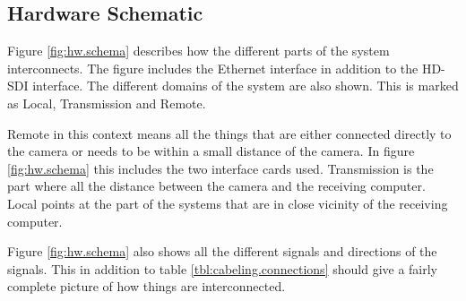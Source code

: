 \subsection{Hardware Schematic}
Figure \vref{fig:hw.schema} describes how the different parts of the system interconnects. The figure includes the Ethernet interface in addition to the 
HD-SDI interface. The different domains of the system are also shown. This is marked as Local, Transmission and Remote.

Remote in this context means all the things that are either connected directly to the camera or needs to be within a small distance of the camera. In figure \ref{fig:hw.schema} 
this includes the two interface cards used. Transmission is the part where all the distance between the camera and the receiving computer. Local points at the part 
of the systems that are in close vicinity of the receiving computer. 

Figure \ref{fig:hw.schema} also shows all the different signals and directions of the signals. This in addition to table \vref{tbl:cabeling.connections} should 
give a fairly complete picture of how things are interconnected.

